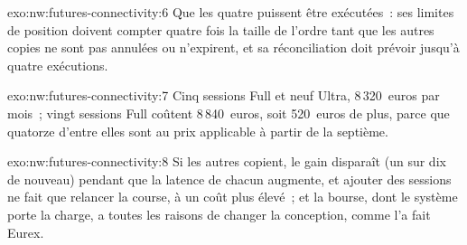 \begin{solution}{exo:nw:futures-connectivity:6}
Que les quatre puissent être exécutées~: ses limites de position doivent compter quatre fois la taille de l'ordre tant que les autres copies ne sont pas annulées ou
n'expirent, et sa réconciliation doit prévoir jusqu'à quatre exécutions.
\end{solution}

\begin{solution}{exo:nw:futures-connectivity:7}
Cinq sessions Full et neuf Ultra, 8\,320~euros par mois~; vingt sessions Full coûtent 8\,840~euros, soit 520~euros de plus, parce que quatorze d'entre elles
sont au prix applicable à partir de la septième.
\end{solution}

\begin{solution}{exo:nw:futures-connectivity:8}
Si les autres copient, le gain disparaît (un sur dix de nouveau) pendant que la latence de chacun augmente, et ajouter des sessions ne fait que relancer la
course, à un coût plus élevé~; et la bourse, dont le système porte la charge, a toutes les raisons de changer la conception, comme l'a fait Eurex.
\end{solution}

